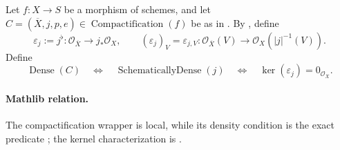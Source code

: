 \begin{definition}
  \label{def:nagata-dense-compactification}

  Let \(f\colon X\to S\) be a morphism of schemes, and let
  $C=(\overline X,j,p,e)\in
  \operatorname{Compactification}(f)$ be as in
  .  By
  , define
  \[
    \varepsilon_j:=j^\flat\colon\mathcal O_{\overline X}\longrightarrow
      j_*\mathcal O_X,
    \qquad
    (\varepsilon_j)_V=\varepsilon_{j,V}\colon
      \mathcal O_{\overline X}(V)\longrightarrow
      \mathcal O_X(|j|^{-1}(V)).
  \]
  Define
  \[
    \operatorname{Dense}(C)
      \quad\Longleftrightarrow\quad
    \operatorname{SchematicallyDense}(j)
      \quad\Longleftrightarrow\quad
    \ker(\varepsilon_j)=0_{\mathcal O_{\overline X}}.
  \]

  \paragraph{Mathlib relation.}
  The compactification wrapper is local, while its density condition is the
  exact predicate
  \texttt{};
  the kernel characterization is
  \texttt{}.
\end{definition}

